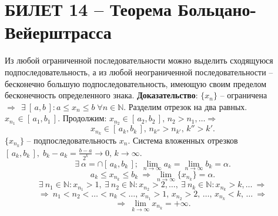 \documentclass{article}
\newcommand{\numberset}[1]{\mathbb{#1}}
\newcommand{\N}{\numberset{N}}
\begin{document}
\section{БИЛЕТ 14 -- Теорема Больцано-Вейерштрасса}
Из любой ограниченной последовательности можно выделить сходящуюся подпоследовательность, а из любой неограниченной последовательности -- бесконечно большую подпоследовательность, имеющую своим пределом бесконечность определенного знака.
\newline
\newline
\textbf{Доказательство}:
\newline
\newline
$\{x_{n}\}$ -- ограничена $\Rightarrow\:\:\exists\:[\,a,b\,]:a\leqslant x_{n}\leqslant b\;\forall n\in\N. $
\newline
Разделим отрезок на два равных. $ x_{n_{1}}\in [\,a_{1},b_{1}\,]. $
\newline
Продолжим: $x_{n_{2}}\in [\,a_{2},b_{2}\,],\,n_{2}>n_{1},\ldots\Rightarrow$
\newline
$$ x_{n_{k}}\in [\,a_{k},b_{k}\,],\,n_{k''}>n_{k'},\,k''>k'. $$
$\{x_{n_{k}}\}$ -- подпоследовательность $x_{n}$.
\newline
Система вложенных отрезков $[\,a_{k},b_{k}\,],\;b_{k}-a_{k}=\frac{b-a}{2^{k}}\to0,\,k\to\infty.$
$$ \exists\:\alpha=\cap[\,a_{k},b_{k}\,];\;\lim_{n\to\infty}a_{k}=\lim_{n\to\infty}b_{k}=\alpha. $$
$$ a_{k}\leqslant x_{n_{k}}\leqslant b_{k}\:\Rightarrow\:\lim_{n\to\infty}\{x_{n_{k}}\}=\alpha. $$
$$ \exists\: n_{1}\in\N:x_{n_{1}}>1,\:\exists\:n_{2}\in\N:x_{n_{2}}>2,\ldots,\:\exists\:n_{k}\in\N:x_{n_{k}}>k,\ldots\:\Rightarrow $$
$$ \Rightarrow\:n_{1}<n_{2}<\ldots<n_{k}<\ldots,\,x_{n_{1}}>1,\,x_{n_{2}}>2,\,\ldots,\,x_{n_{k}}<k,\,\ldots\:\Rightarrow $$
$$ \Rightarrow\:\lim_{k\to\infty}x_{n_{k}}=+\infty. $$
\newpage
\end{document}
